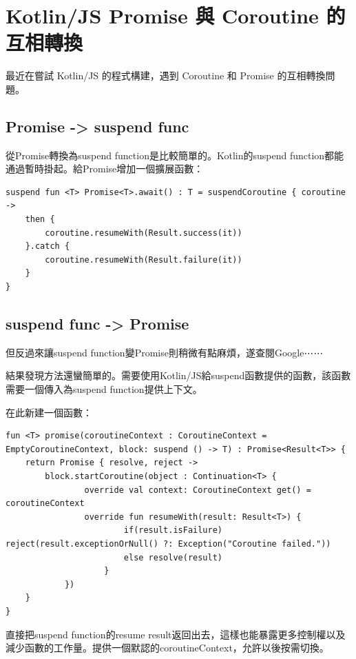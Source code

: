 \chapter{Kotlin/JS Promise 與 Coroutine 的互相轉換}


最近在嘗試 Kotlin/JS 的程式構建，遇到 Coroutine 和 Promise 的互相轉換問題。

\section*{Promise -> suspend func}

從Promise轉換為suspend function是比較簡單的。Kotlin的suspend function都能通過暫時掛起。給Promise增加一個擴展函數：

\begin{lstlisting}
suspend fun <T> Promise<T>.await() : T = suspendCoroutine { coroutine ->
    then { 
        coroutine.resumeWith(Result.success(it)) 
    }.catch { 
        coroutine.resumeWith(Result.failure(it)) 
    }
}
\end{lstlisting}

\section*{suspend func -> Promise}

但反過來讓suspend function變Promise則稍微有點麻煩，遂查閱Google⋯⋯

結果發現方法還蠻簡單的。需要使用Kotlin/JS給suspend函數提供的函數，該函數需要一個傳入為suspend function提供上下文。

在此新建一個函數：

\begin{lstlisting}
fun <T> promise(coroutineContext : CoroutineContext = EmptyCoroutineContext, block: suspend () -> T) : Promise<Result<T>> {
    return Promise { resolve, reject ->
        block.startCoroutine(object : Continuation<T> {
                override val context: CoroutineContext get() = coroutineContext
                override fun resumeWith(result: Result<T>) {
                        if(result.isFailure) reject(result.exceptionOrNull() ?: Exception("Coroutine failed."))
                        else resolve(result)
                    }
            })
    }
}
\end{lstlisting}

直接把suspend function的resume result返回出去，這樣也能暴露更多控制權以及減少函數的工作量。提供一個默認的coroutineContext，允許以後按需切換。

